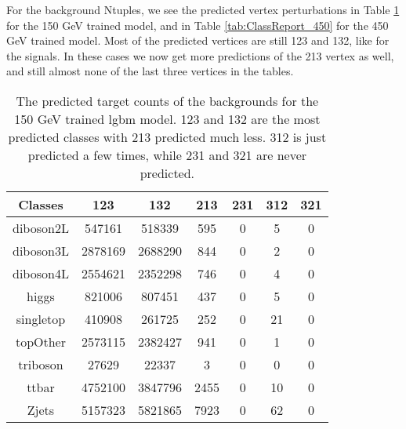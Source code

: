 \documentclass[a4paper, american, 12pt]{report}
\begin{document}
	For the background Ntuples, we see the predicted vertex perturbations in Table \ref{tab:Counts_150_Ntuples} for the 150 GeV trained model, and in Table \ref{tab:ClassReport_450} for the 450 GeV trained model. Most of the predicted vertices are still 123 and 132, like for the signals. In these cases we now get more predictions of the 213 vertex as well, and still almost none of the last three vertices in the tables.
	\begin{table}[htbp!]
		\centering
		\begin{tabular}{ |c|c|c|c|c|c|c| }
			\hline \rule{0pt}{13pt}
			Classes & 123 & 132 & 213 & 231 & 312 & 321 \\
			\hline \rule{0pt}{13pt}
			diboson2L & 547161 & 518339 & 595 & 0 & 5 & 0 \\
			\hline \rule{0pt}{13pt}
			diboson3L & 2878169 & 2688290 & 844 & 0 & 2 & 0 \\
			\hline \rule{0pt}{13pt}
			diboson4L & 2554621 & 2352298 & 746 & 0 & 4 & 0 \\
			\hline \rule{0pt}{13pt}
			higgs & 821006 & 807451 & 437 & 0 & 5 & 0 \\
			\hline \rule{0pt}{13pt}
			singletop & 410908 & 261725 & 252 & 0 & 21 & 0 \\
			\hline \rule{0pt}{13pt}
			topOther & 2573115 & 2382427 & 941 & 0 & 1 & 0 \\
			\hline \rule{0pt}{13pt}
			triboson & 27629 & 22337 & 3 & 0 & 0 & 0 \\
			\hline \rule{0pt}{13pt}
			ttbar & 4752100 & 3847796 & 2455 & 0 & 10 & 0 \\
			\hline \rule{0pt}{13pt}
			Zjets & 5157323 & 5821865 & 7923 & 0 & 62 & 0 \\
			\hline
		\end{tabular}	
		\caption[Target counts of backgrounds for 150 GeV trained classifier.]{The predicted target counts of the backgrounds for the 150 GeV trained \acrshort{lgbm} model. 123 and 132 are the most predicted classes with 213 predicted much less. 312 is just predicted a few times, while 231 and 321 are never predicted.}
		\label{tab:Counts_150_Ntuples}
	\end{table}
\end{document}

